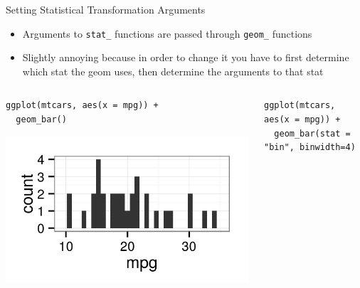 \documentclass[table,smaller]{beamer}
\begin{document}
\begin{frame}[fragile,label=sec-3-2]{Setting Statistical Transformation Arguments}
 \begin{itemize}
\item Arguments to \texttt{stat\_} functions are passed through \texttt{geom\_} functions
\item Slightly annoying because in order to change it you have to first determine which stat the geom uses, then determine the arguments to that stat
\end{itemize}

\begin{columns}
\begin{column}{0.5\textwidth}

\begin{columns}  \begin{block}{}

\begin{verbatim}
ggplot(mtcars, aes(x = mpg)) +
  geom_bar()
\end{verbatim}

\includegraphics[width=.9\linewidth]{images/GeomBinDefaults.png}

\end{block} \end{columns}
\end{column}

\begin{column}{0.5\textwidth}

\begin{columns}  \begin{block}{}

\begin{verbatim}
ggplot(mtcars, aes(x = mpg)) +
  geom_bar(stat = "bin", binwidth=4)
\end{verbatim}


\end{block}
\end{columns}
\end{column}
\end{columns}
\end{frame}
\end{document}
